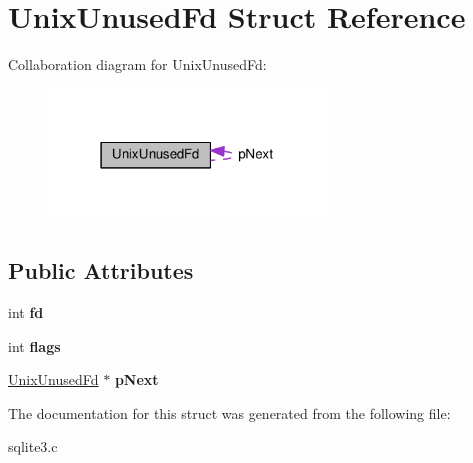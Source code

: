\hypertarget{structUnixUnusedFd}{}\section{Unix\+Unused\+Fd Struct Reference}
\label{structUnixUnusedFd}


Collaboration diagram for Unix\+Unused\+Fd\+:\nopagebreak
\begin{figure}[H]
\begin{center}
\leavevmode
\includegraphics[width=210pt]{structUnixUnusedFd__coll__graph}
\end{center}
\end{figure}
\subsection*{Public Attributes}
\begin{DoxyCompactItemize}
\item 
int {\bfseries fd}\hypertarget{structUnixUnusedFd_a3f1a6127218af971aeb7b131c9c1600d}{}\label{structUnixUnusedFd_a3f1a6127218af971aeb7b131c9c1600d}

\item 
int {\bfseries flags}\hypertarget{structUnixUnusedFd_a744cd118bd91ec2019108e8205708684}{}\label{structUnixUnusedFd_a744cd118bd91ec2019108e8205708684}

\item 
\hyperlink{structUnixUnusedFd}{Unix\+Unused\+Fd} $\ast$ {\bfseries p\+Next}\hypertarget{structUnixUnusedFd_a6bbcba75beeabdd2df126638bc1d8bc0}{}\label{structUnixUnusedFd_a6bbcba75beeabdd2df126638bc1d8bc0}

\end{DoxyCompactItemize}


The documentation for this struct was generated from the following file\+:\begin{DoxyCompactItemize}
\item 
sqlite3.\+c\end{DoxyCompactItemize}
